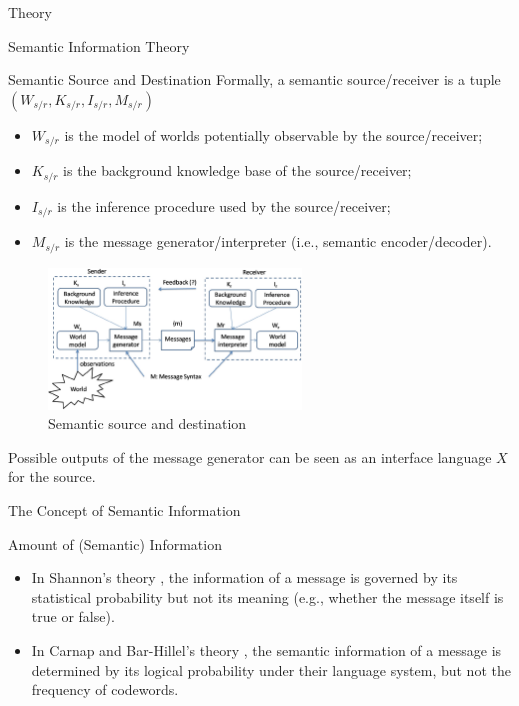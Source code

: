\documentclass[presentation,mathserif,9pt]{beamer}
\begin{document}
\begin{section}{Theory}
	\begin{subsection}{Semantic Information Theory}
		\begin{frame}{Semantic Source and Destination}
			Formally, a semantic source/receiver is a tuple $(W_{s/r}, K_{s/r}, I_{s/r}, M_{s/r})$
			\begin{itemize}
				\item $W_{s/r}$ is the model of worlds potentially observable by the source/receiver;
				\item $K_{s/r}$ is the background knowledge base of the source/receiver;
				\item $I_{s/r}$ is the inference procedure used by the source/receiver;
				\item $M_{s/r}$ is the message generator/interpreter (i.e., semantic encoder/decoder).
			\end{itemize}
			\begin{figure}
				\includegraphics[width=0.6\textwidth]{assets/semantic_source_and_destination.jpg}
				\caption{Semantic source and destination \cite{Bao2011}}
			\end{figure}
			\vspace{-0.2cm}
			Possible outputs of the message generator can be seen as an interface language $X$ for the source.
		\end{frame}

		\begin{frame}{The Concept of Semantic Information}
			\begin{alertblock}{Amount of (Semantic) Information}
				\begin{itemize}
					\item In Shannon's theory \cite{Shannon1948}, the information of a message is governed by its \alert{statistical probability} but not its meaning (e.g., whether the message itself is true or false).
					\item In Carnap and Bar-Hillel's theory \cite{Carnap1952}, the semantic information of a message is determined by its \alert{logical probability} under their language system, but not the frequency of codewords.
				\end{itemize}
			\end{alertblock}


\end{frame}
\end{subsection}
\end{section}
\end{document}
